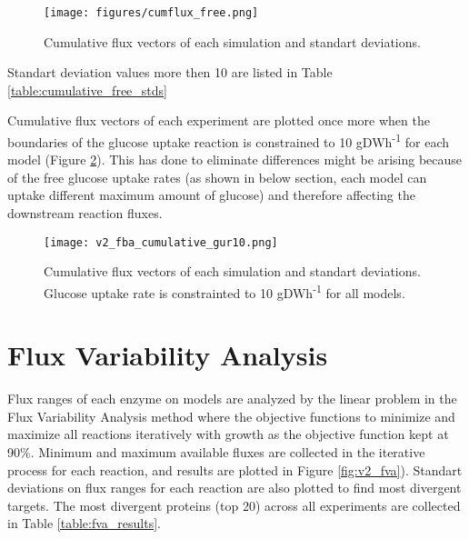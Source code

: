 \begin{figure}[H]
\begin{center}
\texttt{[image: figures/cumflux\_free.png]}
\caption[Cumulative flux vectors of each simulation and standart deviations]{Cumulative flux vectors of each simulation and standart deviations.}
\end{center}
\label{fig:cumflux_free}
\end{figure}

Standart deviation values more then 10 are listed in Table \ref{table:cumulative_free_stds}


Cumulative flux vectors of each experiment are plotted once more when the boundaries of the glucose uptake reaction is constrained to 10 gDWh\textsuperscript{-1} for each model (Figure \ref{fig:v2_fba_cumulative_gur10}). This has done to eliminate differences might be arising because of the free glucose uptake rates (as shown in below section, each model can uptake different maximum amount of glucose) and therefore affecting the downstream reaction fluxes.

\begin{figure}[H]
\begin{center}
\texttt{[image: v2\_fba\_cumulative\_gur10.png]}
\caption[Cumulative flux vectors of each experiment when glucose uptake rate is constrained]{Cumulative flux vectors of each simulation and standart deviations. Glucose uptake rate is constrainted to  10 gDWh\textsuperscript{-1} for all models. }
\end{center}
\label{fig:v2_fba_cumulative_gur10}
\end{figure}


\section{Flux Variability Analysis}
Flux ranges of each enzyme on models are analyzed by the linear problem in the Flux Variability Analysis method where the objective functions to minimize and maximize all reactions iteratively with growth as the objective function kept at 90\%. Minimum and maximum available fluxes are collected in the iterative process for each reaction, and results are plotted in Figure \ref{fig:v2_fva}). Standart deviations on flux ranges for each reaction are also plotted to find most divergent targets. The most divergent proteins (top 20) across all experiments are collected in Table \ref{table:fva_results}.

